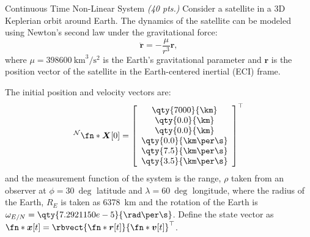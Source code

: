 \begin{hwkProblem}{3}{Continuous Time Non-Linear System \textit{(40 pts.)}} \label{hwk:p03}
	Consider a satellite in a 3D Keplerian orbit around Earth. The dynamics of the satellite can be modeled using Newton's second law under the gravitational force:
	\[
		\ddot{\boldsymbol{r}}=-\frac{\mu}{r^3} \boldsymbol{r},
	\]
	where \(\mu=\qty{398600}{\km\cubed\per\s\squared}\) is the Earth's gravitational parameter and \(\boldsymbol{r}\) is the position vector of the satellite in the Earth-centered inertial (ECI) frame.

	The initial position and velocity vectors are:
	\[
		{}^{\mathcal{N}} \fn*{\boldsymbol{X}}[0]=\left[\begin{array}{c}
				\qty{7000}{\km} \\
				\qty{0.0}{\km} \\
				\qty{0.0}{\km} \\
				\qty{0.0}{\km\per\s} \\
				\qty{7.5}{\km\per\s} \\
				\qty{3.5}{\km\per\s}
		\end{array}\right]^{\top}
	\]
	and the measurement function of the system is the range, \(\rho\) taken from an observer at \(\phi=\qty{30}{\deg}\) latitude and \(\lambda=\qty{60}{\deg}\) longitude, where the radius of the Earth, \(R_E\) is taken as \qty{6378}{\km} and the rotation of the Earth is \(\omega_{E / N}=\qty{7.2921150e-5}{\rad\per\s}\). Define the state vector as \(\fn*{\boldsymbol{x}}[t]={\rbvect{\fn*{\boldsymbol{r}}[t]}{\fn*{\boldsymbol{v}}[t]}}^{\top}\).


\end{hwkProblem}
